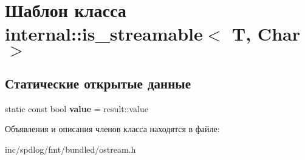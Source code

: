 \hypertarget{classinternal_1_1is__streamable}{}\section{Шаблон класса internal\+:\+:is\+\_\+streamable$<$ T, Char $>$}
\label{classinternal_1_1is__streamable}
\subsection*{Статические открытые данные}
\begin{DoxyCompactItemize}
\item 
\mbox{\label{classinternal_1_1is__streamable_afc01f41166c453d140b52f96020f32b5}} 
static const bool {\bfseries value} = result\+::value
\end{DoxyCompactItemize}


Объявления и описания членов класса находятся в файле\+:\begin{DoxyCompactItemize}
\item 
inc/spdlog/fmt/bundled/ostream.\+h\end{DoxyCompactItemize}
